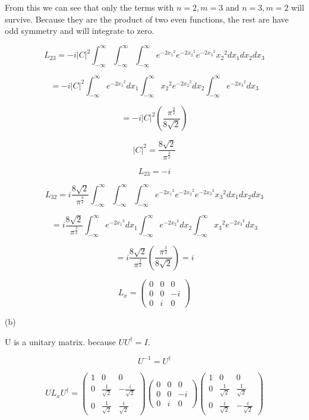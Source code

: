 \documentclass[12pt]{article}
\begin{document}
From this we can see that only the terms with \(n = 2, m = 3\) and \(n = 3, m = 2\) will survive.
Because they are the product of two even functions, the rest are have odd symmetry and will integrate to zero.

\[
    L_{23} = -i{\left\lvert C\right\rvert}^2
    \int_{-\infty }^{\infty}
    \int_{-\infty}^{\infty}
    \int_{-\infty}^{\infty}
    e^{-2{x_1}^2}e^{-2{x_2}^2}e^{-2{x_3}^2}
    {x_2}^2  d{x_1} d{x_2} d{x_3}
\]

\[
    = -i{\left\lvert C\right\rvert}^2
    \int_{-\infty }^{\infty}e^{-2{x_1}^2}d{x_1}
    \int_{-\infty}^{\infty}{x_2}^2e^{-2{x_2}^2}d{x_2}
    \int_{-\infty}^{\infty}e^{-2{x_3}^2}d{x_3}
\]

\[
    = -i{\left\lvert C\right\rvert}^2
    \left(\frac{\pi^{\frac{3}{2}}}{8\sqrt{2}}\right)
\]

\[
    {\left\lvert C\right\rvert}^2 = \frac{8\sqrt{2}}{\pi^{\frac{3}{2}}}
\]

\[
    L_{23} = -i
\]

\[
    L_{32} = i \frac{8\sqrt{2}}{\pi^{\frac{3}{2}}}
    \int_{-\infty }^{\infty}
    \int_{-\infty}^{\infty}
    \int_{-\infty}^{\infty}
    e^{-2{x_1}^2}e^{-2{x_2}^2}e^{-2{x_3}^2}
    {x_3}^2  d{x_1} d{x_2} d{x_3}
\]

\[
    = i \frac{8\sqrt{2}}{\pi^{\frac{3}{2}}}
    \int_{-\infty }^{\infty}e^{-2{x_1}^2}d{x_1}
    \int_{-\infty}^{\infty}e^{-2{x_2}^2}d{x_2}
    \int_{-\infty}^{\infty}{x_3}^2e^{-2{x_3}^2}d{x_3}
\]

\[
    = i \frac{8\sqrt{2}}{\pi^{\frac{3}{2}}}
    \left(\frac{\pi^{\frac{3}{2}}}{8\sqrt{2}}\right)
    = i
\]

\[
    L_x =
    \begin{pmatrix}
        0 & 0 & 0  \\
        0 & 0 & -i \\
        0 & i & 0
    \end{pmatrix}
\]

(b)

U is a unitary matrix. because \(U U^\dagger = I\).

\[
    U^{-1} = U^\dagger
\]

\[
    U L_x U^\dagger
    = \begin{pmatrix}
        1 & 0                  & 0                   \\
        0 & \frac{1}{\sqrt{2}} & -\frac{i}{\sqrt{2}} \\
        0 & \frac{1}{\sqrt{2}} & \frac{i}{\sqrt{2}}
    \end{pmatrix}
    \begin{pmatrix}
        0 & 0 & 0  \\
        0 & 0 & -i \\
        0 & i & 0
    \end{pmatrix}
    \begin{pmatrix}
        1 & 0                  & 0                   \\
        0 & \frac{1}{\sqrt{2}} & \frac{1}{\sqrt{2}}  \\
        0 & \frac{i}{\sqrt{2}} & -\frac{i}{\sqrt{2}}
    \end{pmatrix}
\]
\end{document}
